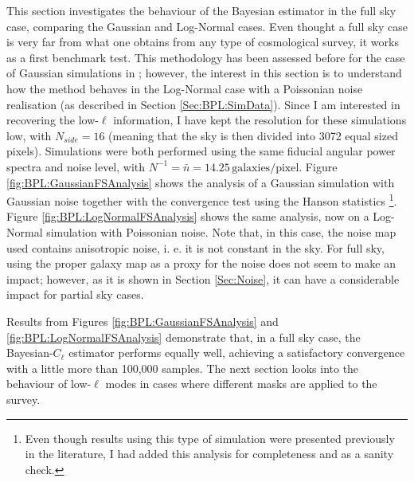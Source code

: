 This section investigates the behaviour of the Bayesian estimator in the full sky case, comparing the Gaussian and Log-Normal cases. Even thought a full sky case is very far from what one obtains from any type of cosmological survey, it works as a first benchmark test. This methodology has been assessed before for the case of Gaussian simulations in \cite{SreeThesis}; however, the interest in this section is to understand how the method behaves in the Log-Normal case with a Poissonian noise realisation (as described in Section \ref{Sec:BPL:SimData}). Since I am interested in recovering the low-$\ell$ information, I have kept the resolution for these simulations low, with $N_{side} = 16$ (meaning that the sky is then divided into 3072 equal sized pixels). Simulations were both performed using the same fiducial angular power spectra and noise level, with $N^{-1} = \bar{n} = 14.25\,  \text{galaxies}/\text{pixel}$. Figure \ref{fig:BPL:GaussianFSAnalysis} shows the analysis of a Gaussian simulation with Gaussian noise together with the convergence test using the Hanson statistics \footnote{Even though results using this type of simulation were presented previously in the literature, I had added this analysis for completeness and as a sanity check.}. Figure \ref{fig:BPL:LogNormalFSAnalysis} shows the same analysis, now on a Log-Normal simulation with Poissonian noise. Note that, in this case, the noise map used contains anisotropic noise, i. e. it is not constant in the sky. For full sky, using the proper galaxy map as a proxy for the noise does not seem to make an impact; however, as it is shown in Section \ref{Sec:Noise}, it can have a considerable impact for partial sky cases.

\qquad Results from Figures \ref{fig:BPL:GaussianFSAnalysis} and \ref{fig:BPL:LogNormalFSAnalysis} demonstrate that, in a full sky case, the Bayesian-$C_{\ell}$ estimator performs equally well, achieving a satisfactory convergence with a little more than 100,000 samples. The next section looks into the behaviour of low-$\ell$ modes in cases where different masks are applied to the survey.

